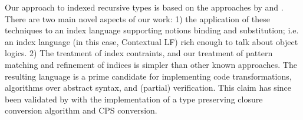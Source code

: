 \documentclass{article}
\begin{document}

Our approach to indexed recursive types is based on the approaches by
\cite{Zenger:TCS97} and \cite{Xi99popl}. There are two main 
novel aspects of our work:
1) the application of these techniques to an index language
supporting notions binding and substitution; i.e. an index language
(in this case, Contextual LF) rich enough to talk about object
logics. 2) The treatment of index contraints, and our treatment of
pattern matching and refinement of indices is simpler than other
known approaches. The resulting language is a prime candidate for
implementing code transformations, algorithms over abstract syntax,
and (partial) verification. This claim has since been validated by
\cite{Belanger13} with the implementation of a type preserving closure
conversion algorithm and CPS conversion.
\end{document}
